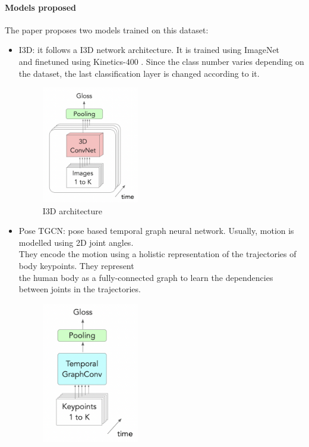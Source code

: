 \paragraph{Models proposed} The paper proposes two models trained on this dataset:
\begin{itemize}
    \item I3D: it follows a I3D network architecture. It is trained using ImageNet \cite{ImageNet} \\ 
    and finetuned using Kinetics-400 \cite{Kinetics400}. Since the class number varies depending on \\
    the dataset, the last classification layer is changed according to it. \\
    \begin{figure}[H]
        \begin{center}
            \includegraphics[width=0.4\textwidth]{assets/i3d.png}
            \caption{I3D architecture}
            \label{fig:introduction_i3d}
        \end{center}
    \end{figure}
    \item Pose TGCN: pose based temporal graph neural network. Usually, motion is modelled using 2D joint angles. \\
    They encode the motion using a holistic representation of the trajectories of body keypoints. They represent \\
    the human body as a fully-connected graph to learn the dependencies between joints in the trajectories. \\
    \begin{figure}[H]
        \begin{center}
            \includegraphics[width=0.4\textwidth]{assets/tgcn.png}

\end{center}
\end{figure}
\end{itemize}
